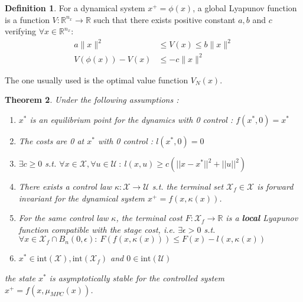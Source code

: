 \documentclass[12pt]{article}
\newtheorem{theorem}{Theorem}[section]
\numberwithin{theorem}{section} %
\theoremstyle{definition}
\newtheorem{definition}[theorem]{Definition}
\theoremstyle{remark}
\def\cal#1{\mathcal{#1}}
\newcommand{\R}{\mathbb{R}}
\begin{document}
\begin{definition}
	For a dynamical system $x^+=\phi(x)$, a global Lyapunov function is a function $V:\R^{n_x}\to\R$ such that there exists positive constant $a,b$ and $c$ verifying $\forall x\in\R^{n_x}$:
	\begin{subequations}
		\label{eq:bruh}
		\begin{align}
			
			a\|x\|^2&\leq V(x)\leq b\|x\|^2\label{eq:1a}\\
			V(\phi(x))-V(x)&\leq -c\|x\|^2\label{eq:1b}
		\end{align}
	\end{subequations}
\end{definition}

The one usually used is the optimal value function $V_N(x)$.
\begin{theorem}
	Under the following assumptions :
	\begin{enumerate}
		\item \label{ass1} $x^*$ is an equilibrium point for the dynamics with 0 control : $f(x^*,0)=x^*$
		
		\item \label{ass2} The costs are 0 at $x^*$ with 0 control : $l(x^*,0)=0$
		
		\item \label{ass3} $\exists c\geq 0$ s.t. $\forall x\in\cal{X},\forall u\in\cal{U}~:~l(x,u)\geq c(||x-x^*||^2+||u||^2)$
		
		\item \label{ass4} There exists a control law $\kappa:\cal{X}\to\cal{U}$ s.t. the terminal set $\cal{X}_f\in\cal{X}$ is forward invariant for the dynamical system $x^+=f(x,\kappa(x))$.
		
		\item \label{ass5} For the same control law $\kappa$, the terminal cost $F:\cal{X}_f\to\R$ is a \textbf{local} Lyapunov function compatible with the stage cost, i.e. $\exists\epsilon>0$ s.t. $\forall x\in\cal{X}_f\cap B_n(0,\epsilon):~F(f(x,\kappa(x)))\leq F(x)-l(x,\kappa(x))$

		\item $x^*\in\mathrm{int}(\cal{X}),\mathrm{int}(\cal{X}_f)$ and $0\in\mathrm{int}(\cal{U})$
	\end{enumerate}
	the state $x^*$ is asymptotically stable for the controlled system $x^+=f(x,\mu_{MPC}(x))$.
\end{theorem}
\end{document}
